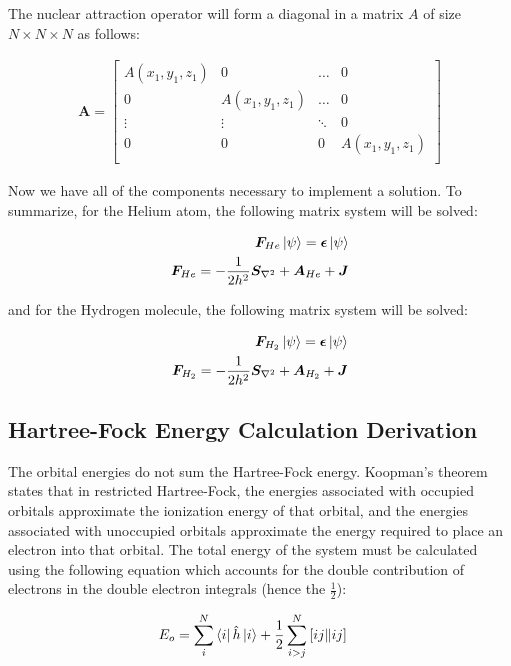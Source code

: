 \documentclass[10pt, oneside, letterpaper]{article}
\begin{document}
The nuclear attraction operator will form a diagonal in a matrix $A$ of size $N \times N \times N$ as follows:

\begin{align*}
\bm{A} =
\begin{bmatrix}
 A(x_1, y_1, z_1) & 0 & \hdots & 0\\
 0 &  A(x_1, y_1, z_1) & \hdots & 0\\
 \vdots & \vdots & \ddots & 0\\
 0 & 0 & 0 &  A(x_1, y_1, z_1)\\
\end{bmatrix}
\end{align*}

Now we have all of the components necessary to implement a solution. To summarize, for the Helium atom, the following matrix system will be solved:

\begin{align*}
  \bm{F}_{He}\ket{\psi} = \bm{\epsilon}\ket{\psi} \\
  \bm{F}_{He} = -\frac{1}{2h^2}\bm{S}_{\nabla^2} + \bm{A}_{He} + \bm{J}
\end{align*}

and for the Hydrogen molecule, the following matrix system will be solved:

\begin{align*}
  \bm{F}_{H_2}\ket{\psi} = \bm{\epsilon}\ket{\psi} \\
  \bm{F}_{H_2} = -\frac{1}{2h^2}\bm{S}_{\nabla^2} + \bm{A}_{H_2} + \bm{J}
\end{align*}

\newpage
\subsection{Hartree-Fock Energy Calculation Derivation}

The orbital energies do not sum the Hartree-Fock energy. Koopman's theorem states that in restricted Hartree-Fock, the energies associated with occupied orbitals approximate the ionization energy of that orbital, and the energies associated with unoccupied orbitals approximate the energy required to place an electron into that orbital. The total energy of the system must be calculated using the following equation which accounts for the double contribution of electrons in the double electron integrals (hence the $\frac{1}{2}$):

\begin{align*}
  E_o &= \sum_i^N\bra{i}\hat{h}\ket{i} + \frac{1}{2}\sum_{i>j}^N\left[ij\|ij\right]
\end{align*}
\end{document}
